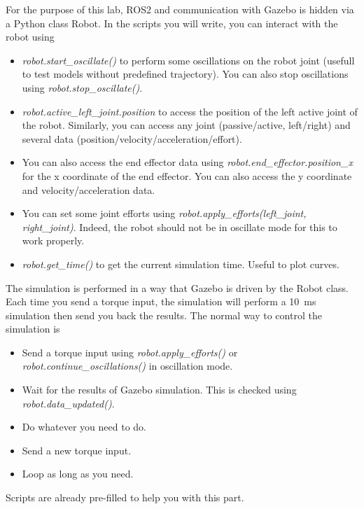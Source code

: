 \documentclass[a4paper]{article}
\begin{document}
For the purpose of this lab, ROS2 and communication with Gazebo is hidden via a Python class Robot. In the scripts you will write, you can interact with the robot using
\begin{itemize}
    \item \textit{robot.start\_oscillate()} to perform some oscillations on the robot joint (usefull to test models without predefined trajectory). You can also stop oscillations using \textit{robot.stop\_oscillate()}. 
    \item \textit{robot.active\_left\_joint.position} to access the position of the left active joint of the robot. Similarly, you can access any joint (passive/active, left/right) and several data (position/velocity/acceleration/effort). 
    \item You can also access the end effector data using 
    \textit{robot.end\_effector.position\_x} for the x coordinate of the end effector. You can also access the y coordinate and velocity/acceleration data.
    \item You can set some joint efforts using 
    \textit{robot.apply\_efforts(left\_joint, right\_joint)}. Indeed, the robot should not be in oscillate mode for this to work properly.
    \item \textit{robot.get\_time()} to get the current simulation time. Useful to plot curves.
\end{itemize}
% 
The simulation is performed in a way that Gazebo is driven by the Robot class. Each time you send a torque input, the simulation will perform a 10~ms simulation then send you back the results. The normal way to control the simulation is
\begin{itemize}
    \item Send a torque input using \textit{robot.apply\_efforts()} or \textit{robot.continue\_oscillations()} in oscillation mode.
    \item Wait for the results of Gazebo simulation. This is checked using \textit{robot.data\_updated()}.
    \item Do whatever you need to do.
    \item Send a new torque input.
    \item Loop as long as you need.
\end{itemize}
%
Scripts are already pre-filled to help you with this part.
%
\end{document}
